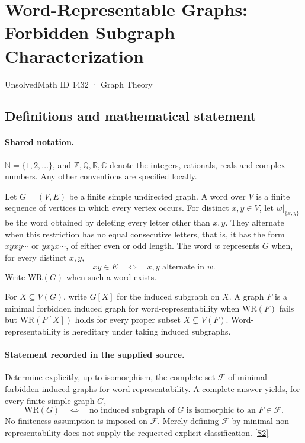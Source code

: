 \documentclass[11pt]{article}
\newcommand{\sref}[2]{\hyperlink{source:#1:#2}{[S#2]}}
\begin{document}
\setcounter{section}{1431}
\section{Word-Representable Graphs: Forbidden Subgraph Characterization}\label{1432}
{\small\sffamily UnsolvedMath ID 1432 · Graph Theory}
\subsection{Definitions and mathematical statement}

\paragraph{Shared notation.}$\mathbb N=\{1,2,\ldots\}$, and $\mathbb Z,\mathbb Q,\mathbb R,\mathbb C$ denote the integers, rationals, reals and complex numbers. Any other conventions are specified locally.


Let $G=(V,E)$ be a finite simple undirected graph. A word over $V$ is a finite sequence of vertices in which every vertex occurs. For distinct $x,y\in V$, let $w|_{\{x,y\}}$ be the word obtained by deleting every letter other than $x,y$. They alternate when this restriction has no equal consecutive letters, that is, it has the form $xyxy\cdots$ or $yxyx\cdots$, of either even or odd length. The word $w$ represents $G$ when, for every distinct $x,y$,
\[
 xy\in E\quad\Longleftrightarrow\quad x,y\text{ alternate in }w.
\]
Write $\mathrm{WR}(G)$ when such a word exists.

For $X\subseteq V(G)$, write $G[X]$ for the induced subgraph on $X$. A graph $F$ is a minimal forbidden induced graph for word-representability when $\mathrm{WR}(F)$ fails but $\mathrm{WR}(F[X])$ holds for every proper subset $X\subsetneq V(F)$. Word-representability is hereditary under taking induced subgraphs.
\paragraph{Statement recorded in the supplied source.}
Determine explicitly, up to isomorphism, the complete set $\mathcal F$ of minimal forbidden induced graphs for word-representability. A complete answer yields, for every finite simple graph $G$,
\[
 \mathrm{WR}(G)\quad\Longleftrightarrow\quad
 \text{no induced subgraph of }G\text{ is isomorphic to an }F\in\mathcal F.
\]
No finiteness assumption is imposed on $\mathcal F$. Merely defining $\mathcal F$ by minimal non-representability does not supply the requested explicit classification. \sref{1432}{2}
\end{document}
